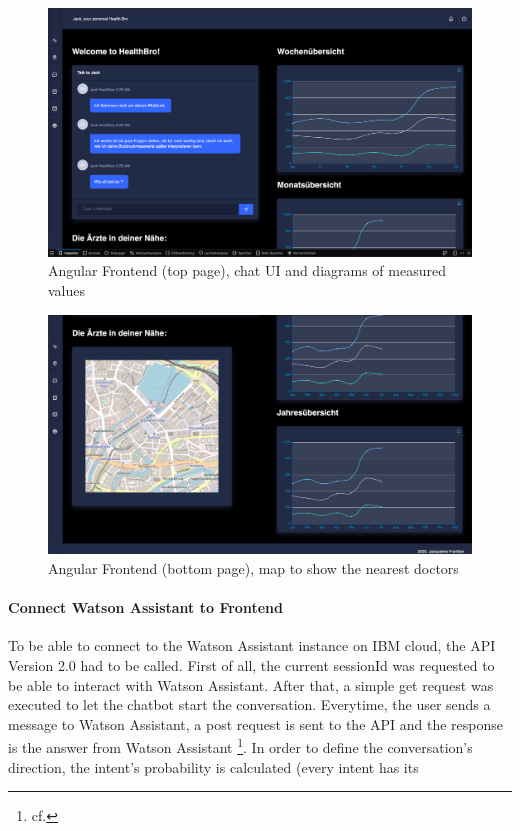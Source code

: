 \begin{figure}[h]
	\centering
	\includegraphics[width=1\textwidth]{images/angular_01.png}
	\caption{Angular Frontend (top page), chat UI and diagrams of measured values}
	\label{angular_01}
\end{figure}
\begin{figure}[h]
	\centering
	\includegraphics[width=1\textwidth]{images/angular_02.png}
	\caption{Angular Frontend (bottom page), map to show the nearest doctors}
	\label{angular_02}
\end{figure}

\paragraph{Connect Watson Assistant to Frontend}

To be able to connect to the Watson Assistant instance on IBM cloud, the API Version 2.0 had to be called. First of all, the current sessionId was requested to be able to interact with Watson Assistant. After that, a simple get request was executed to let the chatbot start the conversation. Everytime, the user sends a message to Watson Assistant, a post request is sent to the API and the response is the answer from Watson Assistant \footnote{cf.\autocite{wa_api_v2}}. In order to define the conversation's direction, the intent's probability is calculated (every intent has its 

